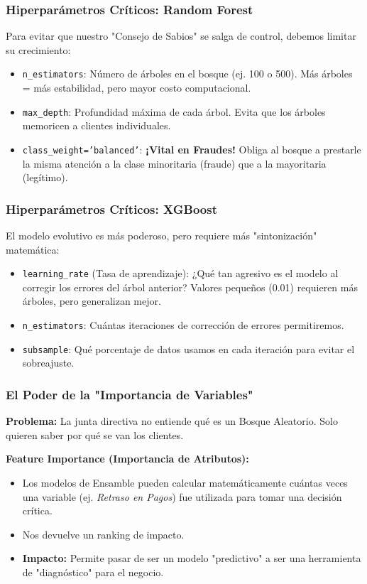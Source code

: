 \documentclass{beamer}
\begin{document}
\begin{frame}
\frametitle{Hiperparámetros Críticos: Random Forest}
Para evitar que nuestro "Consejo de Sabios" se salga de control, debemos limitar su crecimiento:

\vspace{0.3cm}
\begin{itemize}
    \item \texttt{n\_estimators}: Número de árboles en el bosque (ej. 100 o 500). Más árboles = más estabilidad, pero mayor costo computacional.
    \item \texttt{max\_depth}: Profundidad máxima de cada árbol. Evita que los árboles memoricen a clientes individuales.
    \item \texttt{class\_weight='balanced'}: \textbf{¡Vital en Fraudes!} Obliga al bosque a prestarle la misma atención a la clase minoritaria (fraude) que a la mayoritaria (legítimo).
\end{itemize}
\end{frame}

\begin{frame}
\frametitle{Hiperparámetros Críticos: XGBoost}
El modelo evolutivo es más poderoso, pero requiere más "sintonización" matemática:

\vspace{0.3cm}
\begin{itemize}
    \item \texttt{learning\_rate} (Tasa de aprendizaje): ¿Qué tan agresivo es el modelo al corregir los errores del árbol anterior? Valores pequeños (0.01) requieren más árboles, pero generalizan mejor.
    \item \texttt{n\_estimators}: Cuántas iteraciones de corrección de errores permitiremos.
    \item \texttt{subsample}: Qué porcentaje de datos usamos en cada iteración para evitar el sobreajuste.
\end{itemize}
\end{frame}

\begin{frame}
\frametitle{El Poder de la "Importancia de Variables"}
\textbf{Problema:} La junta directiva no entiende qué es un Bosque Aleatorio. Solo quieren saber por qué se van los clientes.

\vspace{0.5cm}
\textbf{Feature Importance (Importancia de Atributos):}
\begin{itemize}
    \item Los modelos de Ensamble pueden calcular matemáticamente cuántas veces una variable (ej. \textit{Retraso en Pagos}) fue utilizada para tomar una decisión crítica.
    \item Nos devuelve un ranking de impacto.
    \item \textbf{Impacto:} Permite pasar de ser un modelo "predictivo" a ser una herramienta de "diagnóstico" para el negocio.
\end{itemize}
\end{frame}
\end{document}
